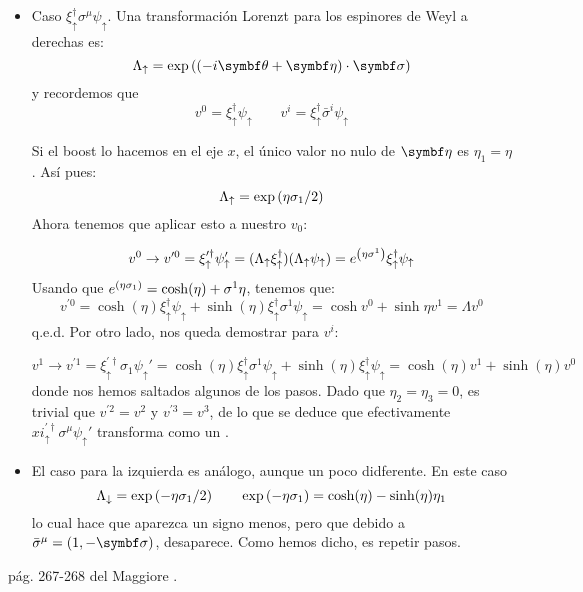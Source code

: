 \begin{itemize}
	\item Caso $\xi_\uparrow^\dagger \sigma^\mu \psi_\uparrow$. Una transformación Lorenzt para los espinores de Weyl a derechas es:
	      \begin{equation}
		      \Lambda_\uparrow = \exp \pqty{(-i\thetan  + \etan)\cdot \sigman}
	      \end{equation}
	      y recordemos que
	      \begin{equation}
		      v^0=\xi_\uparrow^\dagger \psi_\uparrow \qquad v^i =\xi_\uparrow^\dagger  \bar{\sigma}^i \psi_\uparrow
	      \end{equation}

	      Si el boost lo hacemos en el eje $x$, el único valor no nulo de $\etan$ es $\eta_1=\eta$. Así pues:
	      \begin{equation}
		      \Lambda_\uparrow = \exp \pqty{\eta  \sigma_1/2}
	      \end{equation}
	      Ahora tenemos que aplicar esto a nuestro $v_0$:

	      \begin{equation}
		      v^0 \to v^{\prime 0}= \xi_\uparrow^{\prime \dagger} \psi_\uparrow' = (\Lambda_\uparrow \xi_\uparrow^\dagger) (\Lambda_\uparrow \psi_\uparrow) = e^{\pqty{ \eta  \sigma^1}}\xi_\uparrow^\dagger \psi_\uparrow
	      \end{equation}
	      Usando que $e^{\pqty{ \eta  \sigma_1}} = \cosh (\eta)+\sigma^1 \eta $, tenemos que:
	      \begin{equation}
		      v^{\prime 0}= \cosh (\eta) \xi_\uparrow^\dagger \psi_\uparrow  + \sinh (\eta) \xi_\uparrow^\dagger  \sigma^1 \psi_\uparrow = \cosh v^0 + \sinh \eta v^1 =  \Lambda v^0
	      \end{equation}
	      q.e.d. Por otro lado, nos queda demostrar para $v^i$:

	      \begin{equation}
		      v^1 \to v^{\prime 1}= \xi_\uparrow^{\prime \dagger} \sigma_1 \psi_\uparrow' = \cosh (\eta) \xi_\uparrow^\dagger \sigma^1 \psi_\uparrow  + \sinh (\eta) \xi_\uparrow^\dagger \psi_\uparrow = \cosh (\eta) v^1 + \sinh (\eta) v^0
	      \end{equation}
	      donde nos hemos saltados algunos de los pasos. Dado que $\eta_2=\eta_3=0$, es trivial que $v^{\prime 2} = v^2$ y $v^{\prime 3} = v^3$, de lo que se deduce que efectivamente $xi_\uparrow^{\prime \dagger} \sigma^\mu \psi_\uparrow'$ transforma como un .
	\item El caso para la izquierda es análogo, aunque un poco didferente. En este caso
	      \begin{equation}
		      \Lambda_\downarrow = \exp \pqty{-\eta  \sigma_1/2} \qquad \exp \pqty{-\eta  \sigma_1} = \cosh (\eta) - \sinh (\eta) \eta_1
	      \end{equation}
	      lo cual hace que aparezca un signo menos, pero que debido a $\bar{\sigma}^\mu = (1,-\sigman)$, desaparece. Como hemos dicho, es repetir pasos.
\end{itemize}
pág. 267-268 del Maggiore \cite{Maggiore:2005qv}.

